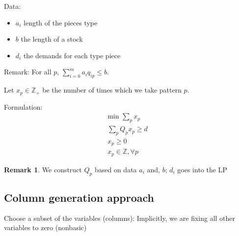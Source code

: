 \documentclass{article}
\theoremstyle{plain}
\theoremstyle{definition}
\newtheorem{rmk}{Remark}
\begin{document}
Data:
\begin{itemize}
    \item $a_i$ length of the pieces type
    \item $b$ the length of a stock
    \item $d_i$ the demands for each type piece
\end{itemize}

Remark: For all $p$, $\sum_{i=0}^m a_i q_{ip} \leq b$.


Let $x_p\in\mathbb{Z}_+$ be the number of times which we take pattern $p$.

Formulation:
\begin{align*}
    \text{min } \sum_p x_p\\
    \sum_p Q_p x_p \geq d\\
    x_p\geq 0\\
    x_p \in\mathbb{Z}, \forall p
\end{align*}

\begin{rmk}
    We construct $Q_p$ based on data $a_i$ and, $b$; $d_i$ goes into the LP
\end{rmk}

\subsection{Column generation approach}
Choose a subset of the variables (columns): Implicitly, we are fixing all other
variables to zero (nonbasic)
\end{document}

